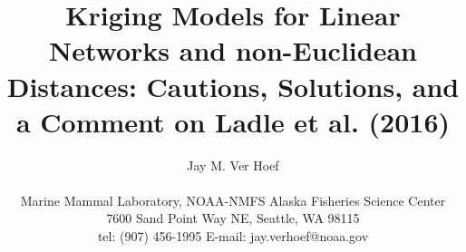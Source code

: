 \documentclass[11pt, titlepage]{article}\usepackage[]{graphicx}\usepackage[]{color}
\begin{document}

\titlepage
\title {Kriging Models for Linear Networks and non-Euclidean Distances: Cautions, Solutions, and a Comment on Ladle et al. (2016)}
\author{Jay M. Ver Hoef \\
\hrulefill \\ 
Marine Mammal Laboratory, NOAA-NMFS Alaska Fisheries Science Center\\
7600 Sand Point Way NE, Seattle, WA 98115\\
tel: (907) 456-1995 \hspace{.5cm} E-mail: jay.verhoef@noaa.gov\\
\hrulefill \\
}

\maketitle
\end{document}
